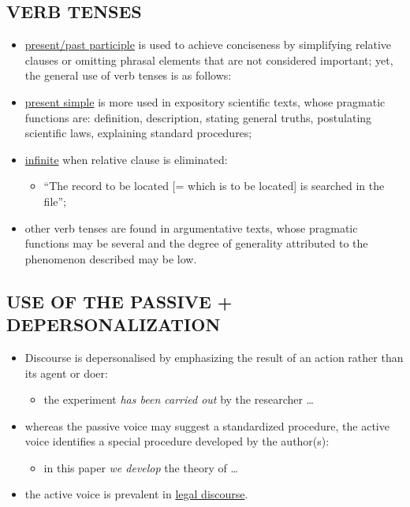 \subsection{VERB TENSES}

\begin{itemize}

\item\underline{present/past participle} is used to achieve conciseness by simplifying relative clauses or omitting phrasal elements that are not considered important; yet, the general use of verb tenses is as follows:

\item\underline{present simple} is more used in expository scientific texts, whose pragmatic functions are: definition, description, stating general truths, postulating scientific laws, explaining standard procedures;

\item\underline{infinite} when relative clause is eliminated: 

\begin{itemize}
\item “The record to be located [= which is to be located] is searched in the file”; 
\end{itemize}

\item other verb tenses are found in argumentative texts, whose pragmatic functions may be several and the degree of generality attributed to the phenomenon described may be low.

\end{itemize}

\subsection{USE OF THE PASSIVE + DEPERSONALIZATION}

\begin{itemize}

\item Discourse is depersonalised by emphasizing the result of an action rather than its agent or doer:

\begin{itemize}
\item the experiment \textit{has been carried out} by the researcher … 
\end{itemize}

\item  whereas the passive voice may suggest a standardized procedure, the active voice identifies a special procedure developed by the author(s):

\begin{itemize}
\item in this paper \textit{we develop} the theory of … 
\end{itemize}

\item the active voice is prevalent in \underline{legal discourse}.

\end{itemize}


